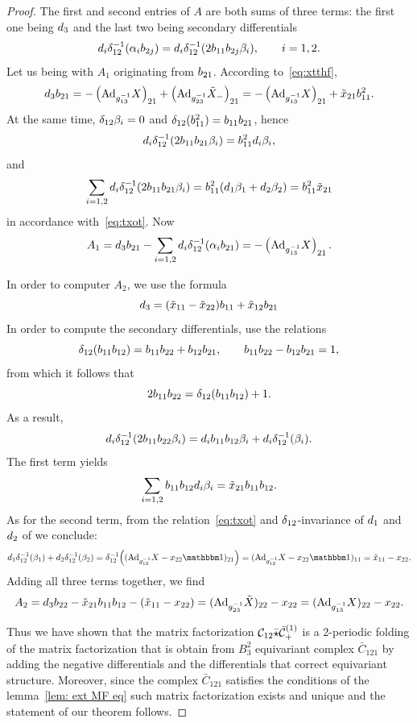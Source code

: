 \begin{proof}
The first and second entries of $A$ are both sums of three terms: the first one being $d_{3}$ and the last two being secondary differentials
\[
d_{i} \delta_{12}^{-1} (\alpha_{i}b_{2j}) = d_{i}\delta_{12}^{-1}(2b_{11}b_{2j}\beta_i) ,
\qquad i=1,2.
\]
Let us being with $A_1$ originating from $b_{21}$. According to~\eqref{eq:xtthf},
\[
d_{3}b_{21} =
-\left({\rm Ad}_{g^{-1}_{13}}X\right)_{21} +\left({\rm Ad}_{g^{-1}_{23}}\tilde{X}_-\right)_{21} =
-\left({\rm Ad}_{g^{-1}_{13}}X\right)_{21} + \tilde{x}_{21}b_{11}^2.
\]
At the same time, $\delta_{12}\beta_i=0$ and $\delta_{12}(b_{11}^2)=b_{11}b_{21}$, hence
\[
d_{i}\delta_{12}^{-1}(2b_{11}b_{21}\beta_i) = b_{11}^2 d_{i}\beta_i,
\]
and
\[
\sum_{i=1,2} d_{i}\delta_{12}^{-1}(2b_{11}b_{21}\beta_i) = b_{11}^2 (d_{1}\beta_1 + d_{2}\beta_2) =
b_{11}^2 \tilde{x}_{21}
\]
in accordance with~\eqref{eq:txot}. Now
\[
A_1 = d_{3}b_{21} - \sum_{i=1,2}d_{i} \delta_{12}^{-1} (\alpha_{i}b_{21}) =
-\left({\rm Ad}_{g^{-1}_{13}}X\right)_{21}.
\]

In order to computer $A_2$, we use the formula
\[
d_{3} =(\tilde{x}_{11}-\tilde{x}_{22})b_{11} + \tilde{x}_{12}b_{21}
\]
In order to compute the secondary differentials,  use the relations
\[
\delta_{12}(b_{11}b_{12}) = b_{11}b_{22} + b_{12}b_{21},\qquad b_{11}b_{22}-b_{12}b_{21} = 1,
\]
from which it follows that
\[
2b_{11}b_{22} = \delta_{12}(b_{11}b_{12}) + 1.
\]
As a result,
\[
d_{i}\delta_{12}^{-1}(2b_{11}b_{22}\beta_i)
=
d_{i}b_{11}b_{12}\beta_i + d_{i}\delta_{12}^{-1}(\beta_i).
\]
The first term yields
\[
\sum_{i=1,2}b_{11}b_{12}d_{i}\beta_i = \tilde{x}_{21}b_{11}b_{12}.
\]
As for the second term, from the relation~\eqref{eq:txot} and $\delta_{12}$-invariance of $d_{1}$ and $d_{2}$ of we conclude:
\[
\ydo \ydltoti(\zbeto) + \ydt \ydltoti(\zbett) =
\ydltoti \Bigl( (\Adv{\xigot}\xX- \xtt\xId)_{21} \Bigr) =
 (\Adv{\xigot}\xX- \xtt\xId)_{11} = \tx_{11} - \xtt.
\]
Adding all three terms together, we find
\[
A_2 = d_{3}b_{22} - \tilde{x}_{21}b_{11}b_{12} - (\tilde{x}_{11}-x_{22}) =({\rm Ad}_{g^{-1}_{23}}\tilde{X})_{22} - x_{22}
=({\rm Ad}_{g^{-1}_{13}}X)_{22} - x_{22}.
\]

Thus we have shown that the matrix factorization $\mathcal{C}_{12}\bar{\star}\bar{\mathcal{C}}_+^{(1)}$ is a $2$-periodic folding of the matrix
factorization that is obtain from $B_3^2$ equivariant complex $\bar{C}_{121}$ by adding the negative differentials and the differentials that
correct equivariant structure. Moreover, since
the complex $\bar{C}_{121}$ satisfies the conditions of the lemma~\ref{lem: ext MF eq} such matrix factorization exists and unique and the statement
of our theorem follows.

\end{proof}

